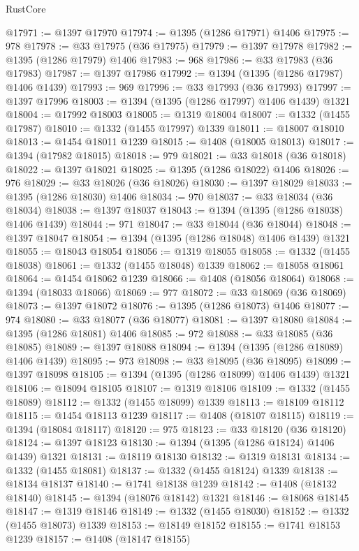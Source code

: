 \begin{lexlean}{RustCore}
\begin{coremodule}
@17971 := @1397 @17970
@17974 := @1395 (@1286 @17971) @1406
@17975 := 978
@17978 := @33 @17975 (@36 @17975)
@17979 := @1397 @17978
@17982 := @1395 (@1286 @17979) @1406
@17983 := 968
@17986 := @33 @17983 (@36 @17983)
@17987 := @1397 @17986
@17992 := @1394 (@1395 (@1286 @17987) @1406 @1439)
@17993 := 969
@17996 := @33 @17993 (@36 @17993)
@17997 := @1397 @17996
@18003 := @1394 (@1395 (@1286 @17997) @1406 @1439) @1321
@18004 := @17992 @18003
@18005 := @1319 @18004
@18007 := @1332 (@1455 @17987)
@18010 := @1332 (@1455 @17997) @1339
@18011 := @18007 @18010
@18013 := @1454 @18011 @1239
@18015 := @1408 (@18005 @18013)
@18017 := @1394 (@17982 @18015)
@18018 := 979
@18021 := @33 @18018 (@36 @18018)
@18022 := @1397 @18021
@18025 := @1395 (@1286 @18022) @1406
@18026 := 976
@18029 := @33 @18026 (@36 @18026)
@18030 := @1397 @18029
@18033 := @1395 (@1286 @18030) @1406
@18034 := 970
@18037 := @33 @18034 (@36 @18034)
@18038 := @1397 @18037
@18043 := @1394 (@1395 (@1286 @18038) @1406 @1439)
@18044 := 971
@18047 := @33 @18044 (@36 @18044)
@18048 := @1397 @18047
@18054 := @1394 (@1395 (@1286 @18048) @1406 @1439) @1321
@18055 := @18043 @18054
@18056 := @1319 @18055
@18058 := @1332 (@1455 @18038)
@18061 := @1332 (@1455 @18048) @1339
@18062 := @18058 @18061
@18064 := @1454 @18062 @1239
@18066 := @1408 (@18056 @18064)
@18068 := @1394 (@18033 @18066)
@18069 := 977
@18072 := @33 @18069 (@36 @18069)
@18073 := @1397 @18072
@18076 := @1395 (@1286 @18073) @1406
@18077 := 974
@18080 := @33 @18077 (@36 @18077)
@18081 := @1397 @18080
@18084 := @1395 (@1286 @18081) @1406
@18085 := 972
@18088 := @33 @18085 (@36 @18085)
@18089 := @1397 @18088
@18094 := @1394 (@1395 (@1286 @18089) @1406 @1439)
@18095 := 973
@18098 := @33 @18095 (@36 @18095)
@18099 := @1397 @18098
@18105 := @1394 (@1395 (@1286 @18099) @1406 @1439) @1321
@18106 := @18094 @18105
@18107 := @1319 @18106
@18109 := @1332 (@1455 @18089)
@18112 := @1332 (@1455 @18099) @1339
@18113 := @18109 @18112
@18115 := @1454 @18113 @1239
@18117 := @1408 (@18107 @18115)
@18119 := @1394 (@18084 @18117)
@18120 := 975
@18123 := @33 @18120 (@36 @18120)
@18124 := @1397 @18123
@18130 := @1394 (@1395 (@1286 @18124) @1406 @1439) @1321
@18131 := @18119 @18130
@18132 := @1319 @18131
@18134 := @1332 (@1455 @18081)
@18137 := @1332 (@1455 @18124) @1339
@18138 := @18134 @18137
@18140 := @1741 @18138 @1239
@18142 := @1408 (@18132 @18140)
@18145 := @1394 (@18076 @18142) @1321
@18146 := @18068 @18145
@18147 := @1319 @18146
@18149 := @1332 (@1455 @18030)
@18152 := @1332 (@1455 @18073) @1339
@18153 := @18149 @18152
@18155 := @1741 @18153 @1239
@18157 := @1408 (@18147 @18155)

\end{coremodule}
\end{lexlean}
